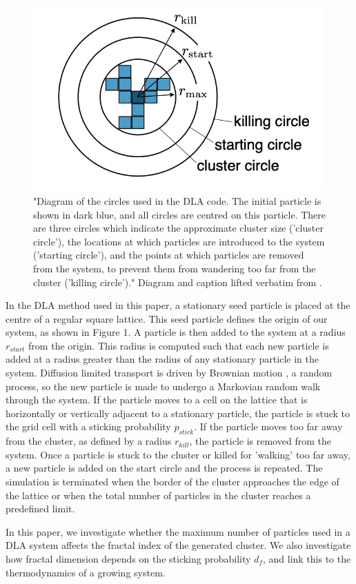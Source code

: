 \documentclass[11pt]{iopart}
\begin{document}
\begin{figure}[h]
  \centering
  \includegraphics[width=0.5\linewidth]{images/circles.png}
  \caption{"Diagram of the circles used in the DLA code. The initial particle is shown in dark blue, and all circles are centred on this particle. There are three circles which indicate the approximate cluster size ('cluster circle'), the locations at which particles are introduced to the system ('starting circle'), and the points at which particles are removed from the system, to prevent them from wandering too far from the cluster ('killing circle')." Diagram and caption lifted verbatim from \cite{handout}.}
  \label{fig:circles}
\end{figure}

In the DLA method used in this paper, a stationary seed particle is placed at the centre of a regular square lattice. This seed particle defines the origin of our system, as shown in Figure 1. A particle is then added to the system at a radius $r_{start}$ from the origin. This radius is computed such that each new particle is added at a radius greater than the radius of any stationary particle in the system. Diffusion limited transport is driven by Brownian motion \cite{brownian}, a random process, so the new particle is made to undergo a Markovian random walk through the system. If the particle moves to a cell on the lattice that is horizontally or vertically adjacent to a stationary particle, the particle is stuck to the grid cell with a sticking probability $p_{stick}$. If the particle moves too far away from the cluster, as defined by a radius $r_{kill}$, the particle is removed from the system. Once a particle is stuck to the cluster or killed for 'walking' too far away, a new particle is added on the start circle and the process is repeated. The simulation is terminated when the border of the cluster approaches the edge of the lattice or when the total number of particles in the cluster reaches a predefined limit.

In this paper, we investigate whether the maximum number of particles used in a DLA system affects the fractal index of the generated cluster. We also investigate how fractal dimension depends on the sticking probability $d_f$, and link this to the thermodynamics of a growing system.
\end{document}
